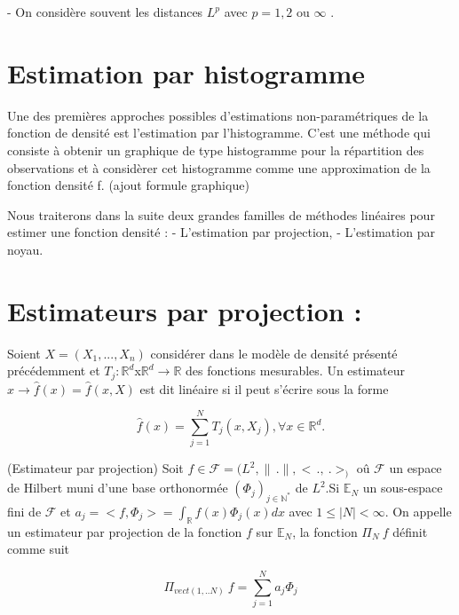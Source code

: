 \documentclass[
]{book}
\begin{document}
\begin{rem}  

- On considère souvent les distances $L^p$ avec $p = 1,2$ ou $\infty$ .
\end{rem}

\hypertarget{estimation-par-histogramme}{%
\section{Estimation par histogramme}\label{estimation-par-histogramme}}

Une des premières approches possibles d'estimations non-paramétriques de la fonction de densité est l'estimation par l'histogramme. C'est une méthode qui consiste à obtenir un graphique de type histogramme pour la répartition des observations et à considèrer cet histogramme comme une approximation de la fonction densité f.\label{eq:cours-est}
(ajout formule graphique)

\hspace*{0.5cm}

Nous traiterons dans la suite deux grandes familles de méthodes linéaires pour estimer une fonction densité : \newline
\hspace*{0.5cm} - L'estimation par projection, \newline
\hspace*{0.5cm} - L'estimation par noyau.

\hypertarget{estimateurs-par-projection}{%
\section{Estimateurs par projection :}\label{estimateurs-par-projection}}

\begin{dfn}
Soient $X= (X_1,...,X_n)$ considérer dans le modèle de densité présenté précédemment et $T_j : \mathbb{R}^d$x$\mathbb{R}^d \rightarrow \mathbb{R}$ des fonctions mesurables.  
Un estimateur $x \rightarrow \hat{f}(x) = \hat{f}(x,X)$ est dit linéaire si il peut s'écrire sous la forme

$$
\hat{f}(x) = \sum^N_{j=1}T_j(x,X_j), \forall x \in \mathbb{R}^d.
$$

\end{dfn}

\begin{dfn}
(Estimateur par projection) \newline
Soit $f \in \mathcal F = (L^2 , \parallel\,.\parallel, <\,.,~.>_)$ oû $\mathcal{F} $ un espace de Hilbert muni d'une base orthonormée $(\Phi_j)_{j \in \mathbb{N^*}}$ de $L^2$.Si $\mathbb E _N$  un sous-espace fini de $\mathcal F$ et $a_j = <f,\Phi_j> = \int_{\mathbb R}f(x)\Phi_j(x) dx$ avec $1 \leq |N| < \infty$.\newline
On appelle un estimateur par projection de la fonction $f$ sur $\mathbb E_N$, la fonction $\Pi_N~f$ définit comme suit 

$$
\Pi_{vect(1,..N)}~f = \sum_{j=1}^N a_j \Phi_j
$$
\end{dfn}
\end{document}
